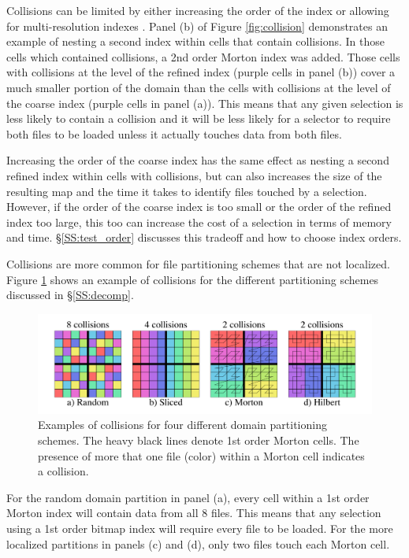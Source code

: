 \documentclass[apjl]{emulateapj}
\begin{document}
Collisions can be limited by either increasing the order of the index or allowing for multi-resolution indexes \citep{Sinha2006,Sinha2007}. Panel (b) of Figure \ref{fig:collision} demonstrates an example of nesting a second index within cells that contain collisions. In those cells which contained collisions, a 2nd order Morton index was added. Those cells with collisions at the level of the refined index (purple cells in panel (b)) cover a much smaller portion of the domain than the cells with collisions at the level of the coarse index (purple cells in panel (a)). This means that any given selection is less likely to contain a collision and it will be less likely for a selector to require both files to be loaded unless it actually touches data from both files.

Increasing the order of the coarse index has the same effect as nesting a second refined index within cells with collisions, but can also increases the size of the resulting map and the time it takes to identify files touched by a selection. However, if the order of the coarse index is too small or the order of the refined index too large, this too can increase the cost of a selection in terms of memory and time. \S\ref{SS:test_order} discusses this tradeoff and how to choose index orders.

Collisions are more common for file partitioning schemes that are not localized. Figure \ref{fig:collision_files} shows an example of collisions for the different partitioning schemes discussed in \S\ref{SS:decomp}.
%
\begin{figure}[htbp]
\begin{center}
\includegraphics[width=\columnwidth,keepaspectratio]{../images/index.png}
\caption{Examples of collisions for four different domain partitioning schemes. The heavy black lines denote 1st order Morton cells. The presence of more that one file (color) within a Morton cell indicates a collision.}
\label{fig:collision_files}
\end{center}
\end{figure}
%
For the random domain partition in panel (a), every cell within a 1st order Morton index will contain data from all 8 files. This means that any selection using a 1st order bitmap index will require every file to be loaded. For the more localized partitions in panels (c) and (d), only two files touch each Morton cell.
\end{document}
